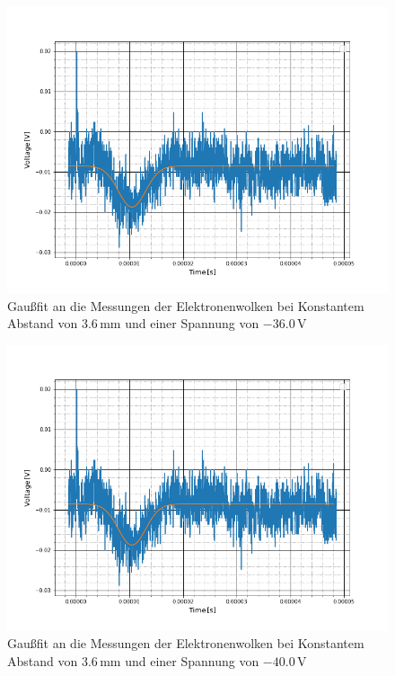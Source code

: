 \begin{figure}
	\includegraphics[scale=0.5]{Bild/A1}
	\centering
	\caption[Gaußfit an Messung bei Konst. Abstand]{Gaußfit an die Messungen der Elektronenwolken bei Konstantem Abstand von $3.6$\,mm und einer Spannung von $-36.0$\,V}
\end{figure}
\begin{figure}
	\includegraphics[scale=0.5]{Bild/A1}
	\centering
	\caption[Gaußfit an Messung bei Konst. Abstand]{Gaußfit an die Messungen der Elektronenwolken bei Konstantem Abstand von $3.6$\,mm und einer Spannung von $-40.0$\,V}
\end{figure}
